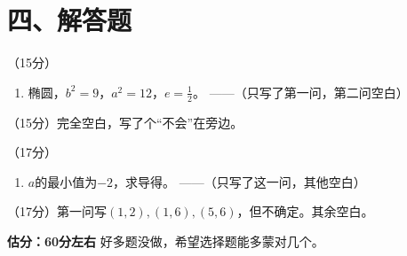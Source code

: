 \documentclass[12pt,a4paper]{article}
\begin{document}
\section*{四、解答题}

\item （15分）
\begin{enumerate}[label=(\arabic*)]
\item 椭圆，$b^2=9$，$a^2=12$，$e=\frac12$。 ——（只写了第一问，第二问空白）
\end{enumerate}

\item （15分）完全空白，写了个“不会”在旁边。

\item （17分）
\begin{enumerate}[label=(\arabic*)]
\item $a$的最小值为$-2$，求导得。 ——（只写了这一问，其他空白）
\end{enumerate}

\item （17分）第一问写$(1,2),(1,6),(5,6)$，但不确定。其余空白。

\vspace{1cm}
\begin{flushright}
\textbf{估分：60分左右} \quad 好多题没做，希望选择题能多蒙对几个。
\end{flushright}
\end{document}
